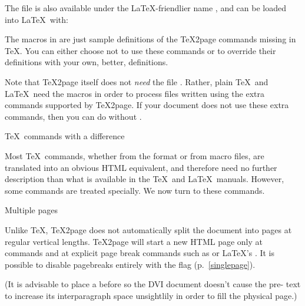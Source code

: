 \p{

}

\n The file is also available
under the \LaTeX-friendlier name , and can be
loaded into \LaTeX\ with:

\p{
\usepackage{tex2page} %
}

The macros in  are just sample
definitions of the \TeX2page commands missing in \TeX.
You can either  choose not to use these commands or to
override their definitions with your own, better,
definitions.


Note that \TeX2page itself does not {\em need} the file
.  Rather, plain \TeX\ and \LaTeX\ need the
 macros in order to process files
written using the extra commands supported by \TeX2page.
If your document does not use these extra
commands, then you can do without .

 \TeX\ commands with a difference

Most \TeX\ commands, whether from the format or from
macro files, are translated into an obvious HTML
equivalent, and therefore need no further description
than what is available in the \TeX\ and \LaTeX\ manuals.
However, some commands are treated
specially.  We now turn to these commands.

\beginsection  Multiple pages

%
Unlike \TeX, \TeX2page does not automatically split the document into
pages at regular vertical lengths.
\TeX2page will start a new HTML page only at \p{\chapter}
commands and at explicit page break commands such as
\p{\eject} or \LaTeX’s \p{\clearpage}. It is possible to disable
pagebreaks entirely with the \p{\TZPsinglepage} flag
(p.~\ref{singlepage}).

(It is advisable to place a \p{\vfill} before
\p{\eject} so the DVI document doesn’t cause the
pre-\p{\eject} text  to increase its
interparagraph space unsightlily in order to fill
the physical page.)

